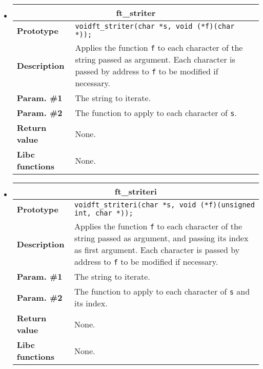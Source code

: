 \documentclass{42-en}
\begin{document}
\begin{itemize}
            \item \begin{tabular}{|l|p{11cm}|}
                \hline
                \multicolumn{2}{|c|}{\textbf{ft\_striter}}\\
                \hline
                \textbf{Prototype} &
                \texttt{void\hspace{5mm}ft\_striter(char *s, void
                  (*f)(char *));}\\
                \hline
                \textbf{Description} & Applies the function \texttt{f}
                to each character of the string passed as
                argument. Each character is passed by address to \texttt{f}
                to be modified if necessary.\\
                \hline
                \textbf{Param. \#1} & The string to iterate.\\
                \hline
                \textbf{Param. \#2} & The function to apply to each
                character of \texttt{s}.\\
                \hline
                \textbf{Return value} & None.\\
                \hline
                \textbf{Libc functions} & None.\\
                \hline
            \end{tabular}

            \item \begin{tabular}{|l|p{11cm}|}
                \hline
                \multicolumn{2}{|c|}{\textbf{ft\_striteri}}\\
                \hline
                \textbf{Prototype} &
                \texttt{void\hspace{5mm}ft\_striteri(char *s, void
                  (*f)(unsigned int, char *));}\\
                \hline
                \textbf{Description} & Applies the function \texttt{f}
                to each character of the string passed as
                argument, and passing its index as first argument.
                Each character is passed by address to \texttt{f}
                to be modified if necessary.\\
                \hline
                \textbf{Param. \#1} & The string to iterate.\\
                \hline
                \textbf{Param. \#2} & The function to apply
                to each character of \texttt{s} and its index.\\
                \hline
                \textbf{Return value} & None.\\
                \hline
                \textbf{Libc functions} & None.\\
                \hline
            \end{tabular}


\end{itemize}
\end{document}

